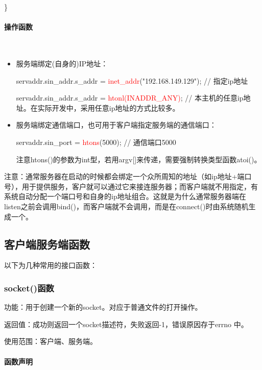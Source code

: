\documentclass[UTF8]{article}%
\begin{document}
\}

\paragraph{操作函数}~{}

\begin{itemize}
    \item 服务端绑定(自身的)IP地址：

    servaddr.sin\_addr.s\_addr = \textcolor{red}{inet\_addr}("192.168.149.129");  // 指定ip地址

    servaddr.sin\_addr.s\_addr = \textcolor{red}{htonl(INADDR\_ANY)};  // 本主机的任意ip地址。在实际开发中，采用任意ip地址的方式比较多。

    \item 服务端绑定通信端口，也可用于客户端指定服务端的通信端口：
    
    servaddr.sin\_port = \textcolor{red}{htons}(5000);  // 通信端口5000

    注意htons()的参数为int型，若用argv[]来传递，需要强制转换类型函数atoi()。

\end{itemize}

注意：通常服务器在启动的时候都会绑定一个众所周知的地址（如ip地址+端口号），用于提供服务，客户就可以通过它来接连服务器；而客户端就不用指定，有系统自动分配一个端口号和自身的ip地址组合。这就是为什么通常服务器端在listen之前会调用bind()，而客户端就不会调用，而是在connect()时由系统随机生成一个。

\subsection{客户端服务端函数}

以下为几种常用的接口函数：

\subsubsection{socket()函数}

功能：用于创建一个新的socket。对应于普通文件的打开操作。

返回值：成功则返回一个socket描述符，失败返回-1，错误原因存于errno 中。

使用范围：客户端、服务端。

\paragraph{函数声明}~{}
\end{document}
